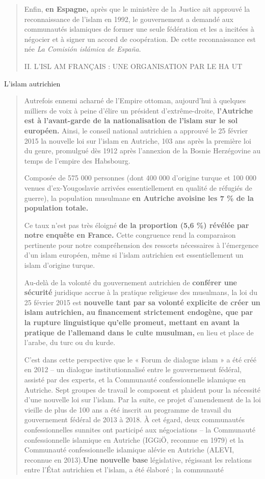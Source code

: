 \begin{quote}
Enfin, \textbf{en Espagne,} après que le ministère de la Justice ait
approuvé la reconnaissance de l'islam en 1992, le gouvernement a demandé
aux communautés islamiques de former une seule fédération et les a
incitées à négocier et à signer un accord de coopération. De cette
reconnaissance est née \emph{La Comisión islámica de España}.

II. L'ISL AM FRANÇAIS : UNE ORGANISATION PAR LE HA UT
\end{quote}

L'islam autrichien

\begin{quote}
Autrefois ennemi acharné de l'Empire ottoman, aujourd'hui à quelques
milliers de voix à peine d'élire un président d'extrême-droite,
\textbf{l'Autriche est à l'avant-garde de la nationalisation de l'islam
sur le sol européen.} Ainsi, le conseil national autrichien a approuvé
le 25 février 2015 la nouvelle loi sur l'islam en Autriche, 103 ans
après la première loi du genre, promulgué dès 1912 après l'annexion de
la Bosnie Herzégovine au temps de l'empire des Habsbourg.

Composée de 575 000 personnes (dont 400 000 d'origine turque et 100 000
venues d'ex-Yougoslavie arrivées essentiellement en qualité de réfugiés
de guerre), la population musulmane \textbf{en Autriche avoisine les 7
\% de la population totale.}

Ce taux n'est pas très éloigné \textbf{de la proportion (5,6 \%) révélée
par notre enquête en France.} Cette congruence rend la comparaison
pertinente pour notre compréhension des ressorts nécessaires à
l'émergence d'un islam européen, même si l'islam autrichien est
essentiellement un islam d'origine turque.

Au-delà de la volonté du gouvernement autrichien de \textbf{conférer une
sécurité} juridique accrue à la pratique religieuse des musulmans, la
loi du 25 février 2015 est \textbf{nouvelle tant par sa volonté
explicite de créer un islam autrichien, au financement strictement
endogène, que par la rupture linguistique qu'elle promeut, mettant en
avant la pratique de l'allemand dans le culte musulman,} en lieu et
place de l'arabe, du turc ou du kurde.

C'est dans cette perspective que le « Forum de dialogue islam » a été
créé en 2012 -- un dialogue institutionnalisé entre le gouvernement
fédéral, assisté par des experts, et la Communauté confessionnelle
islamique en Autriche. Sept groupes de travail le composent et plaident
pour la nécessité d'une nouvelle loi sur l'islam. Par la suite, ce
projet d'amendement de la loi vieille de plus de 100 ans a été inscrit
au programme de travail du gouvernement fédéral de 2013 à 2018. À cet
égard, deux communautés confessionnelles sunnites ont participé aux
négociations -- la Communauté confessionnelle islamique en Autriche
(IGGiÖ, reconnue en 1979) et la Communauté confessionnelle islamique
alévie en Autriche (ALEVI, reconnue en 2013).\textbf{Une nouvelle base}
législative, régissant les relations entre l'État autrichien et l'islam,
a été élaboré ; la communauté




\end{quote}
